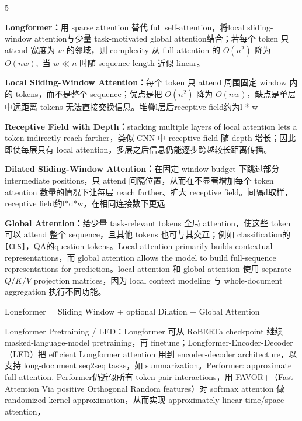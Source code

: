 \documentclass[a4paper, landscape]{article}
\begin{document}
\begin{multicols}{5}
\par \textbf{Longformer：}用 sparse attention 替代 full self-attention，将local sliding-window attention与少量 task-motivated global attention结合；若每个 token 只 attend 宽度为 \(w\) 的邻域，则 complexity 从 full attention 的 \(O(n^2)\) 降为
\(
O(nw),
\)
当 \(w\ll n\) 时随 sequence length 近似 linear。

\par \textbf{Local Sliding-Window Attention：}每个 token 只 attend 周围固定 window 内的 tokens，而不是整个 sequence；优点是把 \(O(n^2)\) 降为 \(O(nw)\)，缺点是单层中远距离 tokens 无法直接交换信息。堆疊l层后receptive field约为l * w

\par \textbf{Receptive Field with Depth：}stacking multiple layers of local attention lets a token indirectly reach farther，类似 CNN 中 receptive field 随 depth 增长；因此即使每层只有 local attention，多层之后信息仍能逐步跨越较长距离传播。

\par \textbf{Dilated Sliding-Window Attention：}在固定 window budget 下跳过部分 intermediate positions，只 attend 间隔位置，从而在不显著增加每个 token attention 数量的情况下让每层 reach farther、扩大 receptive field。间隔d取样，receptive field约l*d*w，在相同连接数下更远

\par \textbf{Global Attention：}给少量 task-relevant tokens 全局 attention，使这些 token 可以 attend 整个 sequence，且其他 tokens 也可与其交互；例如 classification的\texttt{[CLS]}，QA的question tokens。Local attention primarily builds contextual representations，而 global attention allows the model to build full-sequence representations for prediction。local attention 和 global attention 使用 separate \(Q/K/V\) projection matrices，因为 local context modeling 与 whole-document aggregation 执行不同功能。

\par Longformer = Sliding Window + optional Dilation + Global Attention

\par Longformer Pretraining / LED：Longformer 可从 RoBERTa checkpoint 继续 masked-language-model pretraining，再 finetune；Longformer-Encoder-Decoder（LED）把 efficient Longformer attention 用到 encoder-decoder architecture，以支持 long-document seq2seq tasks，如 summarization。Performer: approximate full attention. Performer仍近似所有 token-pair interactions，用 FAVOR+（Fast Attention Via positive Orthogonal Random features）对 softmax attention 做 randomized kernel approximation，从而实现 approximately linear-time/space attention，


\end{multicols}
\end{document}
